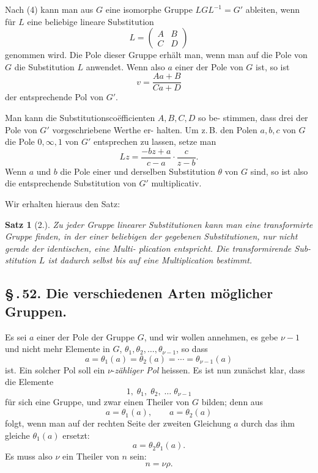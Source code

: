 \documentclass[12pt,a4paper]{article}
\theoremstyle{plain}
\newtheorem{satz}{Satz}[section]
\theoremstyle{definition}
\theoremstyle{remark}
\newcommand{\sect}[1]{\S\,.\,#1.}
\begin{document}
Nach (4) kann man aus $G$ eine isomorphe Gruppe
$LGL^{-1} = G'$
ableiten, wenn f\"ur $L$ eine beliebige lineare Substitution
\[
L = \begin{pmatrix}A & B\\ C & D\end{pmatrix}
\]
genommen wird. Die Pole dieser Gruppe erh\"alt man, wenn man
auf die Pole von $G$ die Substitution $L$ anwendet. Wenn also $a$
einer der Pole von $G$ ist, so ist
\[
v = \frac{Aa+B}{Ca+D}
\]
der entsprechende Pol von $G'$.

Man kann die Substitutionsco\"efficienten $A, B, C, D$ so be-
stimmen, dass drei der Pole von $G'$ vorgeschriebene Werthe er-
halten. Um z.\,B. den Polen $a, b, c$ von $G$ die Pole $0, \infty, 1$ von $G'$
entsprechen zu lassen, setze man
\[
Lz = \frac{-bz+a}{c-a}\cdot\frac{c}{z-b}.
\]
Wenn $a$ und $b$ die Pole einer und derselben Substitution $\theta$
von $G$ sind, so ist also die entsprechende Substitution von $G'$
multiplicativ.

Wir erhalten hieraus den Satz:

\begin{satz}[2.]
Zu jeder Gruppe linearer Substitutionen kann
man eine transformirte Gruppe finden, in der
einer beliebigen der gegebenen Substitutionen,
nur nicht gerade der identischen, eine Multi-
plication entspricht. Die transformirende Sub-
stitution $L$ ist dadurch selbst bis auf eine
Multiplication bestimmt.
\end{satz}


\subsection*{\sect{52} Die verschiedenen Arten m\"oglicher Gruppen.}

Es sei $a$ einer der Pole der Gruppe $G$, und wir wollen
annehmen, es gebe $\nu-1$ und nicht mehr Elemente in $G$,
$\theta_1, \theta_2, \ldots, \theta_{\nu-1}$, so dass
\begin{equation}\label{eq:52_1}
a = \theta_1(a) = \theta_2(a) = \cdots = \theta_{\nu-1}(a)\tag{1}
\end{equation}
ist. Ein solcher Pol soll ein $\nu$-\emph{z\"ahliger Pol} heissen. Es ist
nun zun\"achst klar, dass die Elemente
\begin{equation}\label{eq:52_2}
1,\; \theta_1,\; \theta_2,\; \ldots\; \theta_{\nu-1}\tag{2}
\end{equation}
f\"ur sich eine Gruppe, und zwar einen Theiler von $G$ bilden;
denn aus
\[
a = \theta_1(a),\qquad a = \theta_2(a)
\]
folgt, wenn man auf der rechten Seite der zweiten Gleichung $a$
durch das ihm gleiche $\theta_1(a)$ ersetzt:
\[
a = \theta_2\theta_1(a).
\]
Es muss also $\nu$ ein Theiler von $n$ sein:
\begin{equation}\label{eq:52_3}
n = \nu\rho.\tag{3}
\end{equation}
\end{document}
